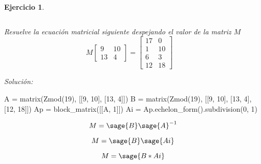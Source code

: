 \documentclass[12pt]{amsart}
\newtheorem{ejer}{Ejercicio}
\begin{document}
\begin{ejer}
\begin{minipage}{\textwidth}
\begin{tcolorbox}[colback = blue!20!white,title=Versión Sistema Matricial]
\[\]\end{tcolorbox}
\end{minipage} \newline
\noindent\begin{minipage}{\textwidth} 
\begin{tcolorbox}[colback = red!20!white,title=Versión Ecuación Matricial]
Resuelve la ecuación matricial siguiente despejando el valor de la matriz $M$
\[M \left[\begin{array}{rr}
9 & 10 \\
13 & 4
\end{array}\right] = \left[\begin{array}{rr}
17 & 0 \\
1 & 10 \\
6 & 3 \\
12 & 18
\end{array}\right] \quad 
\]
\end{tcolorbox}
\end{minipage}%
\end{ejer}


{\it Soluci\'on:}

\begin{sageblock}
A = matrix(Zmod(19), [[9, 10], [13, 4]])
B = matrix(Zmod(19), [[9, 10], [13, 4], [12, 18]])
Ap = block_matrix([[A, 1]])
Ai = Ap.echelon_form().subdivision(0, 1)
\end{sageblock}

$$
	M = \sage{B} \sage{A}^{-1}
$$

$$
	M = \sage{B} \sage{Ai}
$$

$$
	M = \sage{B * Ai}
$$

\end{document}
